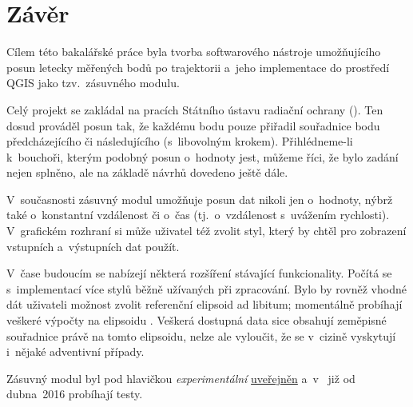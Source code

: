 \chapter{Závěr}
\label{zaver}

Cílem této bakalářské práce byla tvorba
softwarového nástroje umožňujícího posun letecky
měřených bodů po trajektorii a~jeho implementace
do prostředí QGIS jako tzv.~zásuvného modulu. 

Celý projekt se zakládal na pracích Státního
ústavu radiační ochrany (). Ten dosud prováděl posun
tak, že každému bodu pouze přiřadil souřadnice bodu
předcházejícího či následujícího (s~libovolným
krokem). Přihlédneme-li k~bouchoři, kterým podobný posun
o~hodnoty jest, můžeme říci, že bylo zadání
nejen splněno, ale na základě návrhů 
dovedeno ještě dále. 

V~současnosti zásuvný modul umožňuje posun dat
nikoli jen o~hodnoty, nýbrž také o~konstantní
vzdálenost či o~čas (tj.~o~vzdálenost
s~uvážením rychlosti). V~grafic\-kém
rozhraní si může uživatel též zvolit styl,
který by chtěl pro zobrazení vstupních
a~výstupních dat použít. 

V~čase budoucím se nabízejí některá rozšíření
stávající funkcionality. Počítá se s~implementací
více stylů běžně užívaných při zpracování. Bylo by
rovněž vhodné dát uživateli možnost zvolit
referenční elipsoid ad libitum; momentálně
probíhají veš\-keré výpočty na elipsoidu .
Veškerá dostupná data sice obsahují zeměpisné souřadnice
právě na tomto elipsoidu, nelze ale vyloučit, že
se v~cizině vyskytují i~nějaké adventivní případy.

Zásuvný modul byl pod hlavičkou \textit{experimentální}
\href{http://geo.fsv.cvut.cz/osgeorel/qgis-plugins.xml}{uveřejněn} a~v~ již od dubna~2016 probíhají testy.


